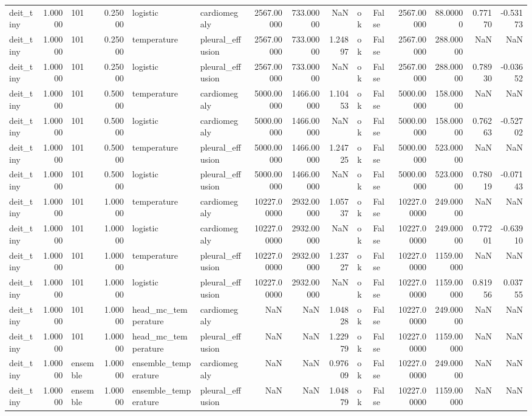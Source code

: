 \begin{tabular}{lrlrllrrrllrrrr}
deit\_tiny & 1.00000 & 101 & 0.25000 & logistic & cardiomegaly & 2567.00000 & 733.00000 & NaN & ok & False & 2567.00000 & 88.00000 & 0.77170 & -0.53173 \\
deit\_tiny & 1.00000 & 101 & 0.25000 & temperature & pleural\_effusion & 2567.00000 & 733.00000 & 1.24897 & ok & False & 2567.00000 & 288.00000 & NaN & NaN \\
deit\_tiny & 1.00000 & 101 & 0.25000 & logistic & pleural\_effusion & 2567.00000 & 733.00000 & NaN & ok & False & 2567.00000 & 288.00000 & 0.78930 & -0.03652 \\
deit\_tiny & 1.00000 & 101 & 0.50000 & temperature & cardiomegaly & 5000.00000 & 1466.00000 & 1.10453 & ok & False & 5000.00000 & 158.00000 & NaN & NaN \\
deit\_tiny & 1.00000 & 101 & 0.50000 & logistic & cardiomegaly & 5000.00000 & 1466.00000 & NaN & ok & False & 5000.00000 & 158.00000 & 0.76263 & -0.52702 \\
deit\_tiny & 1.00000 & 101 & 0.50000 & temperature & pleural\_effusion & 5000.00000 & 1466.00000 & 1.24725 & ok & False & 5000.00000 & 523.00000 & NaN & NaN \\
deit\_tiny & 1.00000 & 101 & 0.50000 & logistic & pleural\_effusion & 5000.00000 & 1466.00000 & NaN & ok & False & 5000.00000 & 523.00000 & 0.78019 & -0.07143 \\
deit\_tiny & 1.00000 & 101 & 1.00000 & temperature & cardiomegaly & 10227.00000 & 2932.00000 & 1.05737 & ok & False & 10227.00000 & 249.00000 & NaN & NaN \\
deit\_tiny & 1.00000 & 101 & 1.00000 & logistic & cardiomegaly & 10227.00000 & 2932.00000 & NaN & ok & False & 10227.00000 & 249.00000 & 0.77201 & -0.63910 \\
deit\_tiny & 1.00000 & 101 & 1.00000 & temperature & pleural\_effusion & 10227.00000 & 2932.00000 & 1.23727 & ok & False & 10227.00000 & 1159.00000 & NaN & NaN \\
deit\_tiny & 1.00000 & 101 & 1.00000 & logistic & pleural\_effusion & 10227.00000 & 2932.00000 & NaN & ok & False & 10227.00000 & 1159.00000 & 0.81956 & 0.03755 \\
deit\_tiny & 1.00000 & 101 & 1.00000 & head\_mc\_temperature & cardiomegaly & NaN & NaN & 1.04828 & ok & False & 10227.00000 & 249.00000 & NaN & NaN \\
deit\_tiny & 1.00000 & 101 & 1.00000 & head\_mc\_temperature & pleural\_effusion & NaN & NaN & 1.22979 & ok & False & 10227.00000 & 1159.00000 & NaN & NaN \\
deit\_tiny & 1.00000 & ensemble & 1.00000 & ensemble\_temperature & cardiomegaly & NaN & NaN & 0.97609 & ok & False & 10227.00000 & 249.00000 & NaN & NaN \\
deit\_tiny & 1.00000 & ensemble & 1.00000 & ensemble\_temperature & pleural\_effusion & NaN & NaN & 1.04879 & ok & False & 10227.00000 & 1159.00000 & NaN & NaN \\
\bottomrule
\end{tabular}
